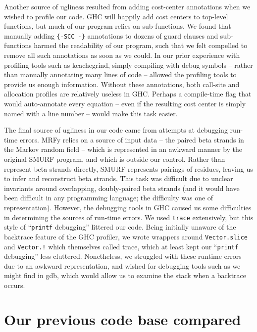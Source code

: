 \documentclass[preprint,nonatbib,blockstyle,nocopyrightspace,times]{sigplanconf}
\begin{document}


Another source of ugliness resulted from adding cost-center annotations when we 
wished to profile our code.
GHC will happily add cost centers to top-level 
functions, but much of our program relies on sub-functions.
We found that 
manually adding \texttt{\{-SCC -\}} annotations to dozens of guard clauses and 
sub-functions harmed the readability of our program, such that we felt 
compelled to remove all such annotations as soon as we could.
In our prior 
experience with profiling tools such as kcachegrind, simply compiling with 
debug symbols -- rather than manually annotating many lines of code -- allowed 
the profiling tools to provide us enough information.
Without these 
annotations, both call-site and allocation profiles are relatively useless in 
GHC.
Perhaps a compile-time flag that would auto-annotate every equation -- 
even if the resulting cost center is simply named with a line number -- would 
make this task easier.

The final source of ugliness in our code came from attempts at debugging 
run-time errors.
MRFy relies on a source of input data -- the paired beta 
strands in the Markov random field -- which is represented in an awkward manner 
by the original SMURF program, and which is outside our control.
Rather than 
represent beta strands directly, SMURF represents pairings of residues, leaving 
us to infer and reconstruct beta strands.
This task was difficult due to 
unclear invariants around overlapping, doubly-paired beta strands (and it would 
have been difficult in any programming language; the difficulty was one of 
representation).
However, the debugging tools in GHC caused us some 
difficulties in determining the sources of run-time errors.
We used 
\texttt{trace} extensively, but this style of ``\texttt{printf} debugging'' 
littered our code.
Being initially unaware of the backtrace feature of the GHC 
profiler, we wrote wrappers around \texttt{Vector.slice} and \texttt{Vector.!} 
which themselves called trace, which at least kept our ``\texttt{printf} 
debugging'' less cluttered.
Nonetheless, we struggled with these runtime errors 
due to an awkward representation, and wished for debugging tools such as we 
might find in gdb, which would allow us to examine the stack when a backtrace 
occurs.
 
 
\section{Our previous code base compared}
\end{document}
